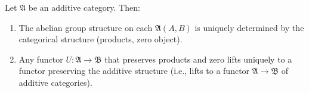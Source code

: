 Let $\mathfrak{A}$ be an additive category. Then:
\begin{enumerate}
\item[(i)] The abelian group structure on each $\mathfrak{A}(A, B)$ is uniquely determined by the categorical structure (products, zero object).
\item[(ii)] Any functor $U : \mathfrak{A} \to \mathfrak{B}$ that preserves products and zero lifts uniquely to a functor preserving the additive structure (i.e., lifts to a functor $\mathfrak{A} \to \mathfrak{B}$ of additive categories).
\end{enumerate}
